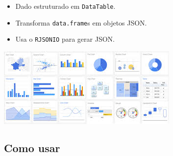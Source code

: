 \begin{frame}
  \begin{itemize}
  \item Dado estruturado em \texttt{DataTable}.
  \item Transforma \texttt{data.frame}s em objetos JSON.
  \item Usa o \texttt{RJSONIO} para gerar JSON.
  \end{itemize}

  \begin{center}
    \includegraphics[width=0.5\linewidth]{./images/googleVis.jpg}
  \end{center}

\end{frame}


\subsection{Como usar}
  


